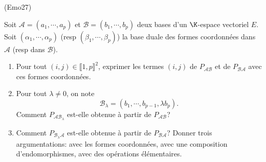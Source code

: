 \begin{tiny}(Emo27)\end{tiny} Soit $\mathcal{A}=(a_1,\cdots,a_p)$ et $\mathcal{B}=(b_1,\cdots,b_p)$ deux bases d'un $\K$-espace vectoriel $E$. Soit $(\alpha_1, \cdots, \alpha_p)$ (resp $(\beta_1, \cdots, \beta_p)$) la base duale des formes coordonnées dans $\mathcal{A}$ (resp dans $\mathcal{B}$).
\begin{enumerate}
  \item Pour tout $(i,j)\in \llbracket 1,p \rrbracket^2$, exprimer les termes $(i,j)$ de $P_{\mathcal{A} \mathcal{B}}$ et de $P_{\mathcal{B} \mathcal{A}}$ avec ces formes coordonnées.
  \item Pour tout $\lambda \neq 0$, on note 
\[
  \mathcal{B}_\lambda = (b_1,\cdots,b_{p-1}, \lambda b_p).
\]
Comment $P_{\mathcal{A} \mathcal{B}_\lambda}$ est-elle obtenue à partir de $P_{\mathcal{A} \mathcal{B}}$?
  \item Comment $P_{\mathcal{B}_\lambda \mathcal{A} }$ est-elle obtenue à partir de $P_{\mathcal{B}\mathcal{A}}$?\newline
Donner trois argumentations: avec les formes coordonnées, avec une composition d'endomorphismes, avec des opérations élémentaires.
\end{enumerate}
